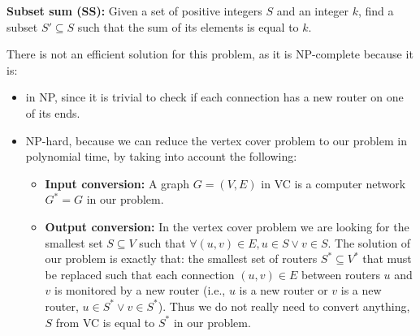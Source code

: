 \documentclass{cal}
\begin{document}
{\textbf{Subset sum (SS):} Given a set of positive integers $S$ and an integer $k$, find a subset $S' \subseteq S$ such that the sum of its elements is equal to $k$.

\ansseparator

There is not an efficient solution for this problem, as it is NP-complete because it is:
\begin{itemize}
    \item in NP, since it is trivial to check if each connection has a new router on one of its ends.
    \item NP-hard, because we can reduce the vertex cover problem to our problem in polynomial time, by taking into account the following:
    \begin{itemize}
        \item \textbf{Input conversion:} A graph $G=(V,E)$ in VC is a computer network $G^* = G$ in our problem.
        \item \textbf{Output conversion:} In the vertex cover problem we are looking for the smallest set $S \subseteq V$ such that $\forall (u,v) \in E, u \in S \vee v \in S$. The solution of our problem is exactly that: the smallest set of routers $S^* \subseteq V^*$ that must be replaced such that each connection $(u,v) \in E$ between routers $u$ and $v$ is monitored by a new router (i.e., $u$ is a new router or $v$ is a new router, $u \in S^* \vee v \in S^*$). Thus we do not really need to convert anything, $S$ from VC is equal to $S^*$ in our problem.
    \end{itemize}
\end{itemize}

}
\end{document}
